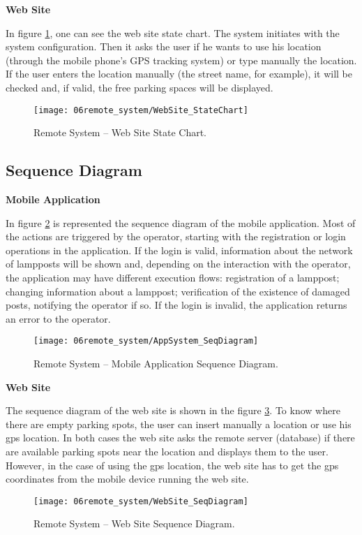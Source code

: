 \textbf{Web Site}

In figure \ref{fig:StateChart_WebSite}, one can see the web site state chart. The system initiates with the system configuration. Then it asks the user if he wants to use his location (through the mobile phone's GPS tracking system) or type manually the location. If the user enters the location manually (the street name, for example), it will be checked and, if valid, the free parking spaces will be displayed.

\begin{figure}[H]
        \centering
        \texttt{[image: 06remote\_system/WebSite\_StateChart]}
        \caption{Remote System – Web Site State Chart.}
        \label{fig:StateChart_WebSite}
\end{figure}

\clearpage
\subsection{Sequence Diagram}
\textbf{Mobile Application}

In figure \ref{fig:SeqDiagram_application} is represented the sequence diagram of the mobile application. Most of the actions are triggered by the operator, starting with the registration or login operations in the application. If the login is valid, information about the network of lampposts will be shown and, depending on the interaction with the operator, the application may have different execution flows: registration of a lamppost; changing information about a lamppost; verification of the existence of damaged posts, notifying the operator if so. If the login is invalid, the application returns an error to the operator.

\begin{figure}[H]
        \centering
        \texttt{[image: 06remote\_system/AppSystem\_SeqDiagram]}
        \caption{Remote System – Mobile Application Sequence Diagram.}
        \label{fig:SeqDiagram_application}
\end{figure}

\textbf{Web Site}

The sequence diagram of the web site is shown in the figure \ref{fig:SeqDiagram_WebSite}. To know where there are empty parking spots, the user can insert manually a location or use his \ac{gps} location. In both cases the web site asks the remote server (database) if there are available parking spots near the location and displays them to the user. However, in the case of using the \ac{gps} location, the web site has to get the \ac{gps} coordinates from the mobile device running the web site.

\begin{figure}[H]
        \centering
        \texttt{[image: 06remote\_system/WebSite\_SeqDiagram]}
        \caption{Remote System – Web Site Sequence Diagram.}
        \label{fig:SeqDiagram_WebSite}
\end{figure}